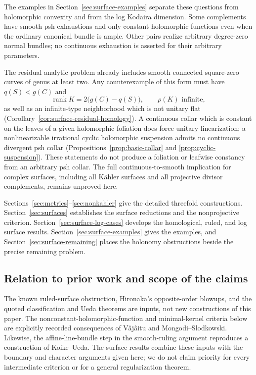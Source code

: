 \documentclass[11pt]{amsart}
\theoremstyle{definition}
\theoremstyle{remark}
\numberwithin{equation}{section}
\begin{document}
The examples in Section~\ref{sec:surface-examples} separate these
questions from holomorphic convexity and from the log Kodaira
dimension. Some complements have smooth psh exhaustions and only
constant holomorphic functions even when the ordinary canonical bundle
is ample. Other pairs realize arbitrary degree-zero normal bundles;
no continuous exhaustion is asserted for their arbitrary parameters.

The residual analytic problem already includes smooth connected
square-zero curves of genus at least two. Any counterexample of this
form must have $q(S)<g(C)$ and
\[
 \operatorname{rank}K=2\bigl(g(C)-q(S)\bigr),\qquad \rho(K)\text{ infinite},
\]
as well as an infinite-type neighborhood which is not unitary flat
(Corollary~\ref{cor:surface-residual-homology}). A continuous collar
which is constant on the leaves of a given holomorphic foliation
does force unitary linearization; a nonlinearizable irrational cyclic
holomorphic suspension admits no continuous divergent psh collar
(Propositions~\ref{prop:basic-collar} and
\ref{prop:cyclic-suspension}). These statements do not produce a
foliation or leafwise constancy from an arbitrary psh collar.
The full continuous-to-smooth implication for complex surfaces,
including all K\"ahler surfaces and all projective divisor complements,
remains unproved here.

Sections~\ref{sec:metrics}--\ref{sec:nonkahler} give the detailed
threefold constructions. Section~\ref{sec:surfaces} establishes the
surface reductions and the nonprojective criterion.
Section~\ref{sec:surface-log-cases} develops the homological, ruled,
and log surface results. Section~\ref{sec:surface-examples} gives the
examples, and Section~\ref{sec:surface-remaining} places the holonomy
obstructions beside the precise remaining problem.

\subsection{Relation to prior work and scope of the claims}
\label{subsec:provenance}

The known ruled-surface obstruction, Hironaka's opposite-order blowups,
and the quoted classification and Ueda theorems are inputs, not new
constructions of this paper. The nonconstant-holomorphic-function and
minimal-kernel criteria below are explicitly recorded consequences of
V\^aj\^aitu and Mongodi--Slodkowski. Likewise, the affine-line-bundle
step in the smooth-ruling argument reproduces a construction of
Koike--Ueda. The surface results combine these inputs with the boundary
and character arguments given here; we do not claim priority for every
intermediate criterion or for a general regularization theorem.
\end{document}
